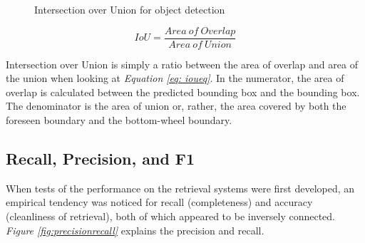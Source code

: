 \begin{figure}[h]
    \centering
    \hfill
    \caption{Intersection over Union for object detection \cite{rosebrock_intersection_2016}}
    \label{figure: iou}
\end{figure}

\begin{equation}
    IoU = \frac{Area\ of\ Overlap}{Area\ of\ Union} \label{eq: ioueq}
\end{equation}
\vspace{0.5cm}

Intersection over Union is simply a ratio between the area of overlap and area of the union when looking at \textit{Equation \ref{eq: ioueq}}.
In the numerator, the area of overlap is calculated between the predicted bounding box and the bounding box.
The denominator is the area of union or, rather, the area covered by both the foreseen boundary and the bottom-wheel boundary\cite{uavs_comparing_2019}.
\subsection{Recall, Precision, and F1}
When tests of the performance on the retrieval systems were first developed, an empirical tendency was noticed for recall (completeness) and accuracy (cleanliness of retrieval), both of which appeared to be inversely connected\cite{buckland_relationship_1994}. \textit{Figure \ref{fig:precisionrecall}} explains the precision and recall.



